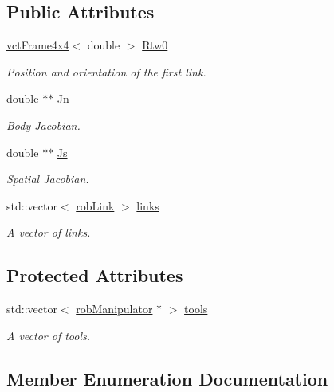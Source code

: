 \subsection*{Public Attributes}
\begin{DoxyCompactItemize}
\item 
\hyperlink{classvct_frame4x4}{vct\+Frame4x4}$<$ double $>$ \hyperlink{classrob_manipulator_ab48d9d9a166bf252698bc35788ca6ad6}{Rtw0}
\begin{DoxyCompactList}\small\item\em Position and orientation of the first link. \end{DoxyCompactList}\item 
double $\ast$$\ast$ \hyperlink{classrob_manipulator_a997ff4a6cabe644ff4dd4877d51e2fb4}{Jn}
\begin{DoxyCompactList}\small\item\em Body Jacobian. \end{DoxyCompactList}\item 
double $\ast$$\ast$ \hyperlink{classrob_manipulator_a5c8636fedd8f1a77ea297f87527cb85e}{Js}
\begin{DoxyCompactList}\small\item\em Spatial Jacobian. \end{DoxyCompactList}\item 
std\+::vector$<$ \hyperlink{classrob_link}{rob\+Link} $>$ \hyperlink{classrob_manipulator_a255e6fb341202762ad75a54c1d040eda}{links}
\begin{DoxyCompactList}\small\item\em A vector of links. \end{DoxyCompactList}\end{DoxyCompactItemize}
\subsection*{Protected Attributes}
\begin{DoxyCompactItemize}
\item 
std\+::vector$<$ \hyperlink{classrob_manipulator}{rob\+Manipulator} $\ast$ $>$ \hyperlink{classrob_manipulator_ae52a521233de4461f871291dbbe4858a}{tools}
\begin{DoxyCompactList}\small\item\em A vector of tools. \end{DoxyCompactList}\end{DoxyCompactItemize}


\subsection{Member Enumeration Documentation}
\hypertarget{classrob_manipulator_a7bbb51cdb81c9c681075a9274ca0cdc0}{}
